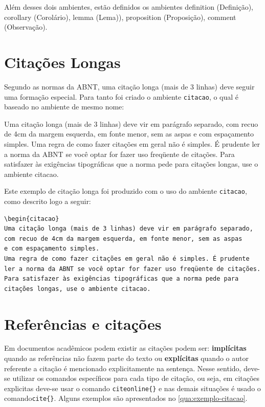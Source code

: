 Além desses dois ambientes, estão definidos os ambientes \textsf{definition} (Definição), \textsf{corollary} (Corolário), \textsf{lemma} (Lema)), \textsf{proposition} (Proposição), \textsf{comment} (Observação).

\section{Citações Longas}
\label{sec:citacoes}

Segundo as normas da ABNT, uma citação longa (mais de 3 linhas) deve seguir uma formação especial. Para tanto foi criado o ambiente \verb|citacao|, o qual é baseado no ambiente de mesmo nome:

\begin{citacao}
Uma citação longa (mais de 3 linhas) deve vir em parágrafo separado,
com recuo de 4cm da margem esquerda, em fonte menor, sem as aspas
e com espaçamento simples.
Uma regra de como fazer citações em geral não é simples. É prudente
ler a norma da ABNT se você optar for fazer uso freqüente de citações.
Para satisfazer às exigências tipográficas que a norma pede para
citações longas, use o ambiente citacao.
\end{citacao}

Este exemplo de citação longa foi produzido com o uso do ambiente \verb|citacao|, como descrito logo a seguir:

\begin{verbatim}
\begin{citacao}
Uma citação longa (mais de 3 linhas) deve vir em parágrafo separado,
com recuo de 4cm da margem esquerda, em fonte menor, sem as aspas
e com espaçamento simples.
Uma regra de como fazer citações em geral não é simples. É prudente
ler a norma da ABNT se você optar for fazer uso freqüente de citações.
Para satisfazer às exigências tipográficas que a norma pede para
citações longas, use o ambiente citacao.
\end{verbatim}

\section{Referências e citações}

Em documentos acadêmicos podem existir as citações podem ser: \textbf{implícitas} quando as referências não fazem parte do texto ou \textbf{explícitas} quando o autor referente a citação é mencionado explicitamente na sentença. Nesse sentido, deve-se utilizar os comandos específicos para cada tipo de citação, ou seja, em citações explicitas deve-se usar o comando \verb|citeonline{}| e nas demais situações é usado o comando\verb|cite{}|. Alguns exemplos são apresentados no \autoref{qua:exemplo-citacao}.

